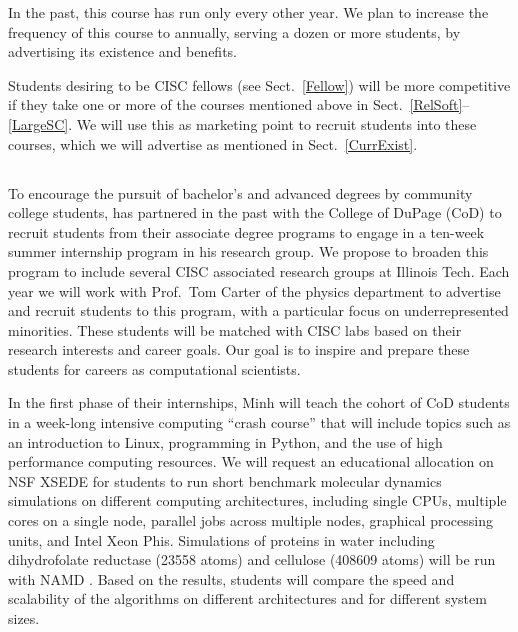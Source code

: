 \documentclass[11pt]{NSFamsart}
\begin{document}
In the past, this course has run only every other year.  We plan to increase the frequency of this course to annually, serving a dozen or more students, by advertising its existence and benefits.

Students desiring to be CISC fellows (see Sect.~\ref{Fellow}) will be more competitive if they take one or more of the courses mentioned above in Sect.~\ref{RelSoft}--\ref{LargeSC}. We will use this as marketing point to recruit students into these courses, which we will advertise as mentioned in Sect.~\ref{CurrExist}.

\subsection{\CODSummerName} \label{CODSummer}

To  encourage the pursuit of bachelor's and advanced degrees by community college students, \JW has partnered in the past with the College of DuPage (CoD) to recruit students from their associate degree programs  to engage in a ten-week summer internship program in his research group.  We propose to broaden this program to include several CISC associated research groups at Illinois Tech. Each year we will work with Prof.~Tom Carter of the physics department to advertise and recruit students to this program,  with a particular focus on underrepresented minorities.  These students will be matched with CISC labs based on their research interests and career goals.  Our goal is to inspire and prepare these students for careers as computational scientists.

In the first phase of their internships, Minh will teach the cohort of CoD students in a week-long intensive computing ``crash course'' that will include topics such as an introduction to Linux, programming in Python, and the use of high performance computing resources. We will request an educational allocation on NSF XSEDE for students to run short benchmark molecular dynamics simulations on different computing architectures, including single CPUs, multiple cores on a single node, parallel jobs across multiple nodes, graphical processing units, and Intel Xeon Phis. Simulations of proteins in water including dihydrofolate reductase (23558 atoms) and cellulose (408609 atoms) will be run with NAMD \cite{Phillips2005}. Based on the results, students will compare the speed and scalability of the algorithms on different architectures and for different system sizes.
\end{document}
